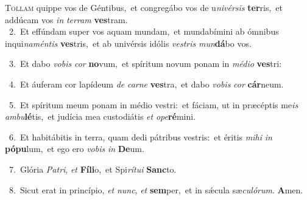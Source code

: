 \lettrine{\initial\textcolor{\initialcolor}{T}}{ollam} quippe vos de Géntibus,~\dagger et congregábo vos de u\-\textit{ni}\-\textit{vér}\textit{sis} \textbf{ter}\-ris,~\star et addúcam vos \textit{in} \textit{ter}\-\textit{ram} \textbf{ves}\-tram.\\
{\numbfont\textcolor{\numbcolor}{~2.}}~Et effúndam super vos aquam mundam,~\dagger et mundabímini ab ómnibus inqui\-\textit{na}\-\textit{mén}\textit{tis} \textbf{ves}\-tris,~\star et ab univérsis idólis \textit{ves}\-\textit{tris} \textit{mun}\-\textbf{dá}bo vos.\par
{\numbfont\textcolor{\numbcolor}{~3.}}~Et dabo \textit{vo}\-\textit{bis} \textit{cor} \textbf{no}\-vum,~\star et spíritum novum ponam in \textit{mé}\-\textit{di}\textit{o} \textbf{ves}\-tri:\par
{\numbfont\textcolor{\numbcolor}{~4.}}~Et áuferam cor lapídeum \textit{de} \textit{car}\-\textit{ne} \textbf{ves}\-tra,~\star et dabo \textit{vo}\-\textit{bis} \textit{cor} \textbf{cár}\-neum.\par
{\numbfont\textcolor{\numbcolor}{~5.}}~Et spíritum meum ponam in médio vestri:~\dagger et fáciam, ut in præcéptis me\textit{is} \textit{am}\-\textit{bu}\textbf{lé}tis,~\star et judícia mea custodiátis \textit{et} \textit{o}\-\textit{pe}\textbf{ré}mini.\par
{\numbfont\textcolor{\numbcolor}{~6.}}~Et habitábitis in terra, quam dedi pátribus vestris:~\dagger et éritis \textit{mi}\-\textit{hi} \textit{in} \textbf{pó}\-\textbf{pu}lum,~\star et ego ero \textit{vo}\-\textit{bis} \textit{in} \textbf{De}\-um.\par
{\numbfont\textcolor{\numbcolor}{~7.}}~Glória \textit{Pa}\-\textit{tri}, \textit{et} \textbf{Fí}\-\textbf{li}o,~\star et Spi\-\textit{rí}\-\textit{tu}\textit{i} \textbf{Sanc}\-to.\par
{\numbfont\textcolor{\numbcolor}{~8.}}~Sicut erat in princípio, \textit{et} \textit{nunc}\-, \textit{et} \textbf{sem}\-per,~\star et in sǽcula sæ\-\textit{cu}\-\textit{ló}\textit{rum}. \textbf{A}\-men.\par
